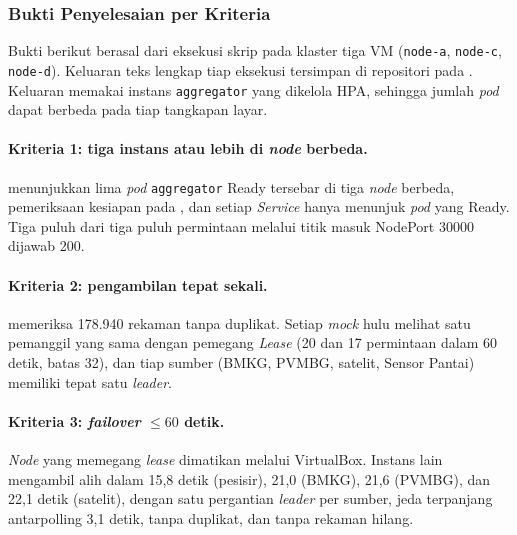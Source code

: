\subsubsection{Bukti Penyelesaian per Kriteria}

Bukti berikut berasal dari eksekusi skrip pada klaster tiga VM (\texttt{node-a}, \texttt{node-c}, \texttt{node-d}). Keluaran teks lengkap tiap eksekusi tersimpan di repositori pada . Keluaran memakai instans \texttt{aggregator} yang dikelola HPA, sehingga jumlah \textit{pod} dapat berbeda pada tiap tangkapan layar.


\paragraph*{Kriteria 1: tiga instans atau lebih di \textit{node} berbeda.}
 menunjukkan lima \textit{pod} \texttt{aggregator} Ready tersebar di tiga \textit{node} berbeda, pemeriksaan kesiapan pada , dan setiap \textit{Service} hanya menunjuk \textit{pod} yang Ready. Tiga puluh dari tiga puluh permintaan melalui titik masuk NodePort 30000 dijawab 200.

\paragraph*{Kriteria 2: pengambilan tepat sekali.}
 memeriksa 178.940 rekaman tanpa duplikat. Setiap \textit{mock} hulu melihat satu pemanggil yang sama dengan pemegang \textit{Lease} (20 dan 17 permintaan dalam 60 detik, batas 32), dan tiap sumber (BMKG, PVMBG, satelit, Sensor Pantai) memiliki tepat satu \textit{leader}.

\paragraph*{Kriteria 3: \textit{failover} $\le 60$ detik.}
\textit{Node} yang memegang \textit{lease} dimatikan melalui VirtualBox. Instans lain mengambil alih dalam 15,8 detik (pesisir), 21,0 (BMKG), 21,6 (PVMBG), dan 22,1 detik (satelit), dengan satu pergantian \textit{leader} per sumber, jeda terpanjang antarpolling 3,1 detik, tanpa duplikat, dan tanpa rekaman hilang.

